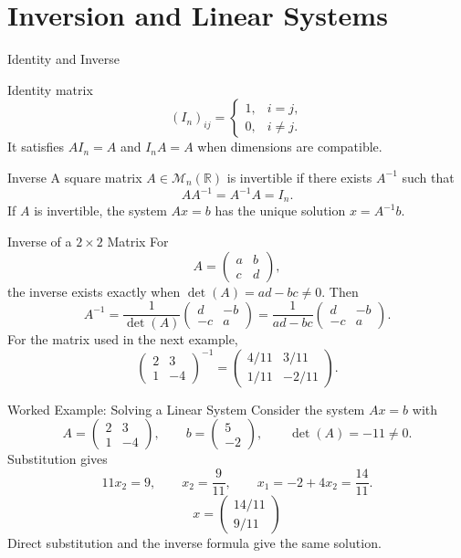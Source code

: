 \documentclass[aspectratio=169]{beamer}
\newcommand{\R}{\mathbb{R}}
\newcommand{\M}{\mathcal{M}}
\begin{document}
\section{Inversion and Linear Systems}

\begin{frame}{Identity and Inverse}
\begin{block}{Identity matrix}
\[
(I_n)_{ij}=
\begin{cases}
1,& i=j,\\
0,& i\neq j.
\end{cases}
\]
It satisfies $AI_n=A$ and $I_nA=A$ when dimensions are compatible.
\end{block}
\pause
\begin{block}{Inverse}
A square matrix $A\in \M_n(\R)$ is invertible if there exists $A^{-1}$ such that
\[
AA^{-1}=A^{-1}A=I_n.
\]
If $A$ is invertible, the system $Ax=b$ has the unique solution $x=A^{-1}b$.
\end{block}
\end{frame}

\begin{frame}{Inverse of a $2\times2$ Matrix}
For
\[
A=\begin{pmatrix}a&b\\c&d\end{pmatrix},
\]
the inverse exists exactly when $\det(A)=ad-bc\neq0$. Then
\[
\boxed{
A^{-1}=\frac{1}{\det(A)}
\begin{pmatrix}d&-b\\-c&a\end{pmatrix}
=\frac{1}{ad-bc}
\begin{pmatrix}d&-b\\-c&a\end{pmatrix}.}
\]
\pause
For the matrix used in the next example,
\[
\begin{pmatrix}2&3\\1&-4\end{pmatrix}^{-1}
=\begin{pmatrix}4/11&3/11\\1/11&-2/11\end{pmatrix}.
\]
\end{frame}

\begin{frame}{Worked Example: Solving a Linear System}
Consider the system $Ax=b$ with
\[
A=\begin{pmatrix}2&3\\1&-4\end{pmatrix},
\qquad b=\begin{pmatrix}5\\-2\end{pmatrix},
\qquad \det(A)=-11\neq0.
\]
\pause
Substitution gives
\[
11x_2=9,
\qquad x_2=\frac9{11},
\qquad x_1=-2+4x_2=\frac{14}{11}.
\]
\pause
\[
\boxed{x=\begin{pmatrix}14/11\\9/11\end{pmatrix}}
\]
Direct substitution and the inverse formula give the same solution.
\end{frame}
\end{document}
